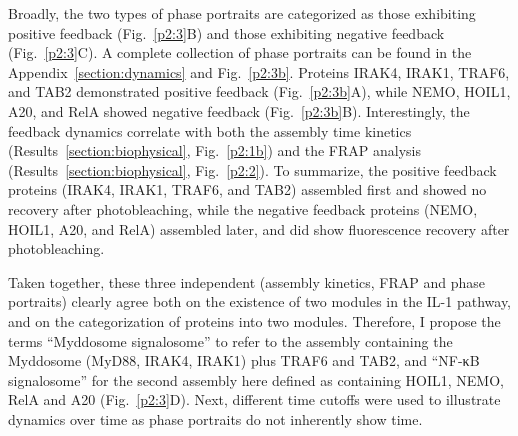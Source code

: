 Broadly, the two types of phase portraits are categorized as those exhibiting positive feedback (Fig.~\ref{p2:3}B) and those exhibiting negative feedback (Fig.~\ref{p2:3}C). A complete collection of phase portraits can be found in the Appendix~\ref{section:dynamics} and Fig.~\ref{p2:3b}. Proteins IRAK4, IRAK1, TRAF6, and TAB2 demonstrated positive feedback (Fig.~\ref{p2:3b}A), while NEMO, HOIL1, A20, and RelA showed negative feedback (Fig.~\ref{p2:3b}B). Interestingly, the feedback dynamics correlate with both the assembly time kinetics (Results~\ref{section:biophysical}, Fig.~\ref{p2:1b}) and the FRAP analysis (Results~\ref{section:biophysical}, Fig.~\ref{p2:2}). To summarize, the positive feedback proteins (IRAK4, IRAK1, TRAF6, and TAB2) assembled first and showed no recovery after photobleaching, while the negative feedback proteins (NEMO, HOIL1, A20, and RelA) assembled later, and did show fluorescence recovery after photobleaching.

Taken together, these three independent (assembly kinetics, FRAP and phase portraits) clearly agree both on the existence of two modules in the IL-1 pathway, and on the categorization of proteins into two modules. Therefore, I propose the terms “Myddosome signalosome” to refer to the assembly containing the Myddosome (MyD88, IRAK4, IRAK1) plus TRAF6 and TAB2, and “NF-κB signalosome” for the second assembly here defined as containing HOIL1, NEMO, RelA and A20 (Fig.~\ref{p2:3}D). Next, different time cutoffs were used to illustrate dynamics over time as phase portraits do not inherently show time.


